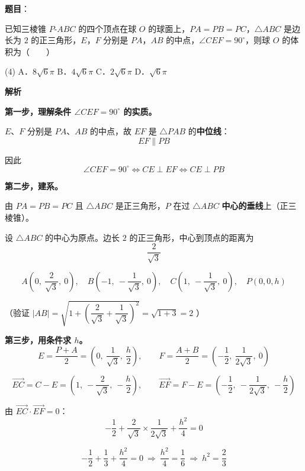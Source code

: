 \begin{answer}

\textbf{题目}：

已知三棱锥 $P\text{-}ABC$ 的四个顶点在球 $O$ 的球面上，$PA=PB=PC$，$\triangle ABC$ 是边长为 $2$ 的正三角形，$E$，$F$ 分别是 $PA$，$AB$ 的中点，$\angle CEF=90^\circ$，则球 $O$ 的体积为\mbox{（　　）}

\begin{gkopts}(4)
\task A．$8\sqrt6\pi$
\task B．$4\sqrt6\pi$
\task C．$2\sqrt6\pi$
\task D．$\sqrt6\pi$
\end{gkopts}

\textbf{解析}

\textbf{第一步，理解条件 $\angle CEF=90^\circ$ 的实质。}

$E$、$F$ 分别是 $PA$、$AB$ 的中点，故 $EF$ 是 $\triangle PAB$ 的\textbf{中位线}：
\nopagebreak[4]
\[EF\parallel PB\]

因此
\nopagebreak[4]
\[\angle CEF=90^\circ\iff CE\perp EF\iff CE\perp PB\]

\textbf{第二步，建系。}

由 $PA=PB=PC$ 且 $\triangle ABC$ 是正三角形，$P$ 在过 $\triangle ABC$ \textbf{中心的垂线}上（正三棱锥）。

设 $\triangle ABC$ 的中心为原点。边长 $2$ 的正三角形，中心到顶点的距离为
\nopagebreak[4]
\[\frac{2}{\sqrt3}\]

\nopagebreak[4]
\[A\left(0,\ \frac2{\sqrt3},\ 0\right),\quad B\left(-1,\ -\frac1{\sqrt3},\ 0\right),\quad C\left(1,\ -\frac1{\sqrt3},\ 0\right),\quad P(0,0,h)\]

（验证 $|AB|=\sqrt{1+\left(\dfrac2{\sqrt3}+\dfrac1{\sqrt3}\right)^{2}}=\sqrt{1+3}=2$ ）

\textbf{第三步，用条件求 $h$。}
\nopagebreak[4]
\[E=\frac{P+A}2=\left(0,\ \frac1{\sqrt3},\ \frac h2\right),\qquad F=\frac{A+B}2=\left(-\frac12,\ \frac1{2\sqrt3},\ 0\right)\]

\nopagebreak[4]
\[\overrightarrow{EC}=C-E=\left(1,\ -\frac2{\sqrt3},\ -\frac h2\right),\qquad \overrightarrow{EF}=F-E=\left(-\frac12,\ -\frac1{2\sqrt3},\ -\frac h2\right)\]

由 $\overrightarrow{EC}\cdot\overrightarrow{EF}=0$：
\nopagebreak[4]
\[-\frac12+\frac2{\sqrt3}\times\frac1{2\sqrt3}+\frac{h^{2}}4=0\]

\nopagebreak[4]
\[-\frac12+\frac13+\frac{h^{2}}4=0\ \Longrightarrow\ \frac{h^{2}}4=\frac16\ \Longrightarrow\ h^{2}=\frac23\]


\end{answer}
